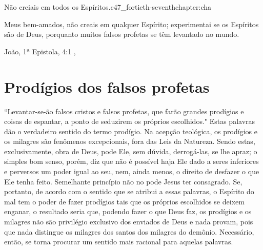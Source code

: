 \begin{chapterpage}{Não creiais em todos os Espíritos.}{c47_fortieth-seventhchapter:cha}
 
\begin{myquotation}Meus bem-amados, não creais em qualquer Espírito; experimentai se os Espíritos são de Deus, porquanto muitos falsos profetas se têm levantado no mundo.
\par\vspace*{15mm}
\mbox{}\hfill \emdash{}João, 1ª Epistola, 4:1
, %
\par\end{myquotation}

\end{chapterpage}



\section{Prodígios dos falsos profetas}\label{c1_basicformatting:sec}

\emdash{}``Levantar-se-ão falsos cristos e falsos profetas, que farão grandes prodígios e coisas de espantar, a ponto de seduzirem os próprios escolhidos." Estas palavras dão o verdadeiro sentido do termo prodígio. Na acepção teológica, os prodígios e os milagres são fenômenos excepcionais, fora das Leis da Natureza. Sendo estas, exclusivamente, obra de Deus, pode
Ele, sem dúvida, derrogá-las, se lhe apraz; o simples bom senso, porém, diz que não é possível haja Ele dado a seres inferiores e perversos um poder igual ao seu, nem, ainda menos, o direito de desfazer o que Ele tenha feito. Semelhante princípio não no pode Jesus ter consagrado. Se, portanto, de acordo com o sentido que se atribui a essas palavras, o Espírito
do mal tem o poder de fazer prodígios tais que os próprios escolhidos se deixem enganar, o resultado seria que, podendo fazer o que Deus faz, os prodígios e os milagres não são privilégio exclusivo dos enviados de Deus e nada provam, pois que nada distingue os milagres dos santos dos milagres do demônio. Necessário, então, se torna procurar um sentido mais racional para aquelas palavras.

